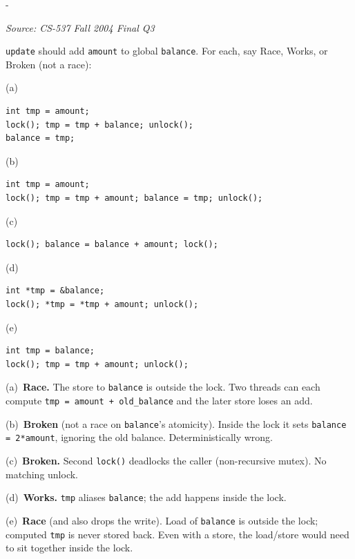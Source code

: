 \documentclass[11pt,a4paper]{article}
\makeatletter
\newcommand{\keepspace}[1]{\par\penalty-100\begingroup
  \setlength{\dimen@}{#1}\dimen@ii\pagegoal\advance\dimen@ii-\pagetotal
  \ifdim\dimen@>\dimen@ii\ifdim\dimen@ii>\z@\vfil\fi\break\fi\endgroup}
\newcounter{qn}[section]
\newenvironment{Qn}[4]{%
  \refstepcounter{qn}\keepspace{7\baselineskip}%
  \begin{tcolorbox}[qboxstyle, title={Q\thesection.\theqn\ \ [#1 \textbar\ #2]\ \ #4}]%
  {\footnotesize\color{g3}\textit{Source: #3}}\par\smallskip%
}{%
  \end{tcolorbox}%
}
\newenvironment{Sol}{%
  \begin{tcolorbox}[sboxstyle, title={Solution}]%
}{%
  \end{tcolorbox}\vspace{0.35em}%
}
\makeatother
\begin{document}
\begin{Qn}{Hard}{Lect 16--17}{CS-537 Fall 2004 Final Q3}{Five broken \texttt{update} snippets}
\texttt{update} should add \texttt{amount} to global \texttt{balance}. For each, say Race, Works, or Broken (not a race):

(a)
\begin{lstlisting}[numbers=none]
int tmp = amount;
lock(); tmp = tmp + balance; unlock();
balance = tmp;
\end{lstlisting}
(b)
\begin{lstlisting}[numbers=none]
int tmp = amount;
lock(); tmp = tmp + amount; balance = tmp; unlock();
\end{lstlisting}
(c)
\begin{lstlisting}[numbers=none]
lock(); balance = balance + amount; lock();
\end{lstlisting}
(d)
\begin{lstlisting}[numbers=none]
int *tmp = &balance;
lock(); *tmp = *tmp + amount; unlock();
\end{lstlisting}
(e)
\begin{lstlisting}[numbers=none]
int tmp = balance;
lock(); tmp = tmp + amount; unlock();
\end{lstlisting}
\end{Qn}
\begin{Sol}
(a)~\textbf{Race.} The store to \texttt{balance} is outside the lock. Two threads can each compute \texttt{tmp = amount + old\_balance} and the later store loses an add.

(b)~\textbf{Broken} (not a race on \texttt{balance}'s atomicity). Inside the lock it sets \texttt{balance = 2*amount}, ignoring the old balance. Deterministically wrong.

(c)~\textbf{Broken.} Second \texttt{lock()} deadlocks the caller (non-recursive mutex). No matching unlock.

(d)~\textbf{Works.} \texttt{tmp} aliases \texttt{balance}; the add happens inside the lock.

(e)~\textbf{Race} (and also drops the write). Load of \texttt{balance} is outside the lock; computed \texttt{tmp} is never stored back. Even with a store, the load/store would need to sit together inside the lock.
\end{Sol}
\end{document}
